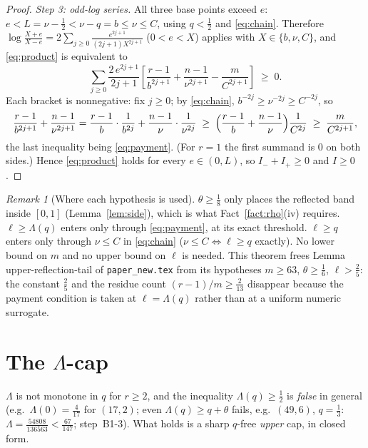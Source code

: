 \documentclass[11pt]{amsart}
\theoremstyle{remark}
\newtheorem{remark}[theorem]{Remark}
\begin{document}
\begin{proof}
\emph{Step 3: odd-log series.}  All three base points exceed $e$: $e<L=\nu-\tfrac12<\nu-q=b\le\nu\le C$, using $q<\tfrac12$ and \eqref{eq:chain}.  Therefore
$\log\frac{X+e}{X-e}=2\sum_{j\ge0}\frac{e^{2j+1}}{(2j+1)X^{2j+1}}$ ($0<e<X$) applies with $X\in\{b,\nu,C\}$, and \eqref{eq:product} is equivalent to
\[
        \sum_{j\ge0}\frac{2\,e^{2j+1}}{2j+1}
        \left[\frac{r-1}{b^{2j+1}}+\frac{n-1}{\nu^{2j+1}}-\frac{m}{C^{2j+1}}\right]
        \;\ge\;0 .
\]
Each bracket is nonnegative: fix $j\ge0$; by \eqref{eq:chain}, $b^{-2j}\ge\nu^{-2j}\ge C^{-2j}$, so
\[
        \frac{r-1}{b^{2j+1}}+\frac{n-1}{\nu^{2j+1}}
        =\frac{r-1}{b}\cdot\frac1{b^{2j}}+\frac{n-1}{\nu}\cdot\frac1{\nu^{2j}}
        \;\ge\;
        \Bigl(\frac{r-1}{b}+\frac{n-1}{\nu}\Bigr)\frac1{C^{2j}}
        \;\ge\;\frac{m}{C^{2j+1}},
\]
the last inequality being \eqref{eq:payment}.  (For $r=1$ the first summand is $0$ on both sides.)  Hence \eqref{eq:product} holds for every $e\in(0,L)$, so $I_-+I_+\ge0$ and $I\ge0$.
\end{proof}

\begin{remark}[Where each hypothesis is used]
$\theta\ge\tfrac18$ only places the reflected band inside $[0,1]$ (Lemma~\ref{lem:side}), which is what Fact~\ref{fact:rho}(iv) requires.  $\ell\ge\Lambda(q)$ enters only through \eqref{eq:payment}, at its exact threshold.  $\ell\ge q$ enters only through $\nu\le C$ in \eqref{eq:chain} ($\nu\le C\iff\ell\ge q$ exactly).  No lower bound on $m$ and no upper bound on $\ell$ is needed.  This theorem frees Lemma upper-reflection-tail of \texttt{paper\_new.tex} from its hypotheses $m\ge63$, $\theta\ge\tfrac16$, $\ell>\tfrac25$: the constant $\tfrac25$ and the residue count $(r-1)/m\ge\tfrac2{13}$ disappear because the payment condition is taken at $\ell=\Lambda(q)$ rather than at a uniform numeric surrogate.
\end{remark}

\section{The $\Lambda$-cap}\label{sec:cap}

$\Lambda$ is not monotone in $q$ for $r\ge2$, and the inequality $\Lambda(q)\ge\tfrac12$ is \emph{false} in general (e.g.\ $\Lambda(0)=\tfrac4{17}$ for $(17,2)$; even $\Lambda(q)\ge q+\theta$ fails, e.g.\ $(49,6)$, $q=\tfrac13$: $\Lambda=\tfrac{54808}{136563}<\tfrac{67}{147}$; step~B1-3).  What holds is a sharp $q$-free \emph{upper} cap, in closed form.
\end{document}
